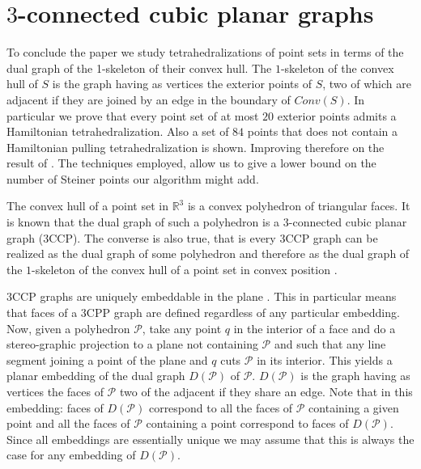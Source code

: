 \documentclass{article}
\begin{document}
\section{$3$-connected cubic planar graphs}\label{section:3ccp}

To conclude the paper we study tetrahedralizations of 
point sets in terms of the dual graph of
the 1-skeleton of their convex hull. The $1$-skeleton of 
the convex hull of $S$ is the graph having as vertices
the exterior points of $S$, two of which are adjacent
if they are joined by an edge in the boundary of $Conv(S)$.
 In particular
we prove that every point set of at most $20$ exterior
points admits a Hamiltonian tetrahedralization. Also
a set of $84$ points that does not contain a Hamiltonian pulling tetrahedralization
is shown. Improving therefore on the result of \cite{isora}. 
The techniques employed, allow us to give a lower bound on the number
of Steiner points our algorithm might add.\par

The convex hull of a point set in $\mathbb{R}^3$ 
is a convex polyhedron of triangular faces. It is known that 
the dual graph of such a polyhedron is a $3$-connected cubic planar graph ($3$CCP).
The converse is also true, that is every  $3$CCP graph can be
realized as the dual graph of some polyhedron and therefore as the 
dual graph of the $1$-skeleton of the convex hull of a point set in convex
position  \cite{steinitz}.\par

$3$CCP graphs are uniquely embeddable in the plane \cite{whitney}. This
in particular means that faces of a $3$CPP graph are defined regardless of any particular 
embedding. Now, given a polyhedron $\mathcal{P}$, take any point $q$ in the interior 
of a face and do a stereo-graphic projection to a plane not containing $\mathcal{P}$
and such that any line segment joining a point of the plane and $q$ cuts
$\mathcal{P}$ in its interior. This yields a planar embedding of the dual graph 
$D(\mathcal{P})$ of $\mathcal{P}$. $D(\mathcal{P})$ is the graph having as vertices
the faces of $\mathcal{P}$ two of the adjacent if they share an edge.
Note that in this embedding: faces of
$D(\mathcal{P})$ correspond to all the faces of $\mathcal{P}$ containing a given point 
and all the faces of $\mathcal{P}$ containing a point correspond to faces of 
$D(\mathcal{P})$. Since all embeddings are essentially unique we may assume that this is 
always the case for any embedding of $D(\mathcal{P})$.\par
\end{document}
